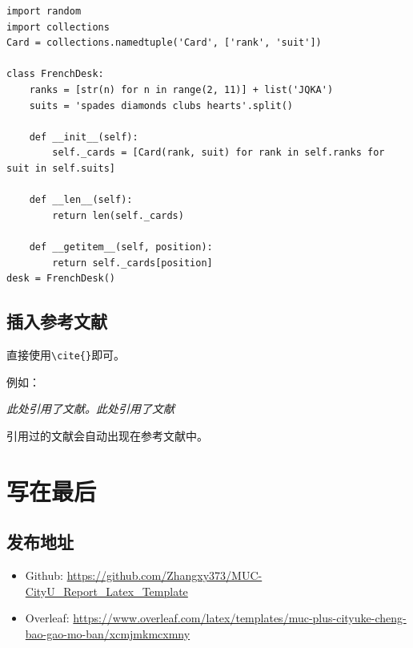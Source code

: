 \documentclass[12pt,hyperref,a4paper,UTF8]{ctexart}
\begin{document}
\begin{lstlisting}[style=Python, title="Python代码"]                
import random
import collections
Card = collections.namedtuple('Card', ['rank', 'suit'])

class FrenchDesk:
    ranks = [str(n) for n in range(2, 11)] + list('JQKA')
    suits = 'spades diamonds clubs hearts'.split()
    
    def __init__(self):
        self._cards = [Card(rank, suit) for rank in self.ranks for suit in self.suits]
        
    def __len__(self):
        return len(self._cards)
        
    def __getitem__(self, position):
        return self._cards[position]
desk = FrenchDesk()
\end{lstlisting}

\subsection{插入参考文献}
直接使用\verb|\cite{}|即可。

例如：

   \textit{ 此处引用了文献\cite{0Isaac}。此处引用了文献\cite{2016The}}

引用过的文献会自动出现在参考文献中。

\section{写在最后}
\subsection{发布地址}
\begin{itemize}
    \item Github: \url{https://github.com/Zhangxy373/MUC-CityU_Report_Latex_Template}
    \item Overleaf:  \url{https://www.overleaf.com/latex/templates/muc-plus-cityuke-cheng-bao-gao-mo-ban/xcmjmkmcxmny}
\end{itemize}


\end{document}
